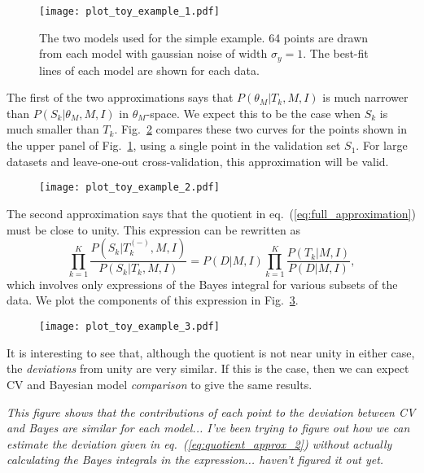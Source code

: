 \documentclass[12pt]{article}
\newcommand{\Tkminus}{\ensuremath{T_k^{(-)}}}
\newcommand{\eqn}[1]{eq.~(\ref{eq:#1})}
\newcommand{\fig}[1]{Fig.~\ref{fig:#1}}
\begin{document}
\begin{figure}
  \centering
  \texttt{[image: plot\_toy\_example\_1.pdf]}
  \caption{The two models used for the simple example.  64 points are drawn
    from each model with gaussian noise of width $\sigma_y = 1$.
    The best-fit lines of each model are shown for each data.}
  \label{fig:model_description}
\end{figure}

The first of the two approximations says that
$P(\theta_M|T_k,M,I)$ is much narrower than
$P(S_k|\theta_M,M,I)$ in $\theta_M$-space.
We expect this to be the case when $S_k$ is much smaller than $T_k$.
\fig{delta_approx} compares these two curves for the points shown in
the upper panel of \fig{model_description}, using a single point in the
validation set $S_1$.  For large datasets and leave-one-out cross-validation,
this approximation will be valid.

\begin{figure}
  \centering
  \texttt{[image: plot\_toy\_example\_2.pdf]}
  \caption{}
  \label{fig:delta_approx}
\end{figure}

The second approximation says that the quotient in \eqn{full_approximation}
must be close to unity.  This expression can be rewritten as
\begin{equation}
  \label{eq:quotient_approx_2}
  \prod_{k=1}^K \frac{P(S_k|\Tkminus,M,I)}
    {P(S_k|T_k,M,I)}
  = P(D|M,I)\prod_{k=1}^K \frac{P(T_k|M,I)}{P(D|M,I)},
\end{equation}
which involves only expressions of the Bayes integral for various subsets of
the data.  We plot the components of this expression in
\fig{quotient_approx}.

\begin{figure}
  \centering
  \texttt{[image: plot\_toy\_example\_3.pdf]}
  \caption{}
  \label{fig:quotient_approx}
\end{figure}

It is interesting to see that, although the quotient is not near unity in either
case, the {\it deviations} from unity are very similar.  If this is the case,
then we can expect CV and Bayesian model {\it comparison} to give the same
results.

{\it This figure shows that the contributions of each point to the deviation
  between CV and Bayes are similar for each model... I've been trying to
  figure out how we can estimate the deviation given in \eqn{quotient_approx_2}
  without actually calculating the Bayes integrals in the expression...
  haven't figured it out yet.}
\end{document}
